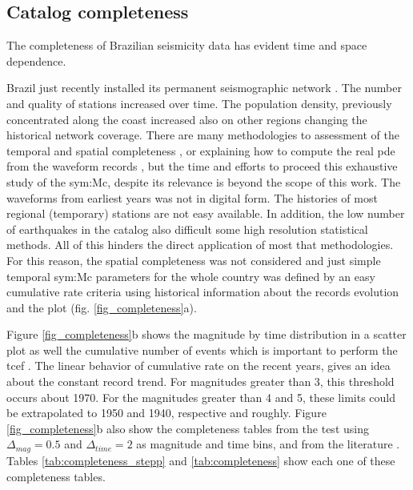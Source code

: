 \documentclass[draft, grl]{agutex}
\begin{document}
\begin{article}
\subsection{Catalog completeness}

The completeness of Brazilian seismicity data has evident time and space dependence.

Brazil just recently installed its permanent seismographic network \citep{pirchiner_2011}. The number and quality of stations increased over time. The population density, previously concentrated along the coast increased also on other regions changing the historical network coverage. %
There are many methodologies to assessment of the temporal and spatial completeness \citep{stepp_1972, mignan_woessner_2012, ogata_1993, wiemer_wyss_2000, cao_gao_2002, stucchi_2004, woessner_2005, mignan_2011, mignan_2012, vorobieva_2013, mignan_2013, nasir_2013, mignan_2014}, or explaining how to compute the real \gls{pde} from the waveform records \citep{schorlemmer_2008}, but the time and efforts to proceed this exhaustive study of the \glsdesc{sym:Mc}, despite its relevance is beyond the scope of this work. The waveforms from earliest years was not in digital form. The histories of most regional (temporary) stations are not easy available. In addition, the low number of earthquakes in the catalog also difficult some high resolution statistical methods. All of this hinders the direct application of most that methodologies. For this reason, the spatial completeness was not considered and just simple temporal \gls{sym:Mc} parameters for the whole country was defined by an easy cumulative rate criteria using historical information about the records evolution and the \citet{stepp_1972} plot (fig. \ref{fig_completeness}a). 

Figure \ref{fig_completeness}b shows the magnitude by time distribution in a scatter plot as well the cumulative number of events which is important to perform the \gls{tcef} \citep{nasir_2013}. The linear behavior of cumulative rate on the recent years, gives an idea about the constant record trend. For magnitudes greater than 3, this threshold occurs about 1970. For the magnitudes greater than 4 and 5, these limits could be extrapolated to 1950 and 1940, respective and roughly. Figure \ref{fig_completeness}b also show the completeness tables from the \citet{stepp_1972} test using $\Delta_{mag}=0.5$ and $\Delta_{time}=2$ as magnitude and time bins, and from the literature \citep{assumpcao_et_al_2014}. Tables \ref{tab:completeness_stepp} and \ref{tab:completeness} show each one of these completeness tables.



\end{article}
\end{document}
